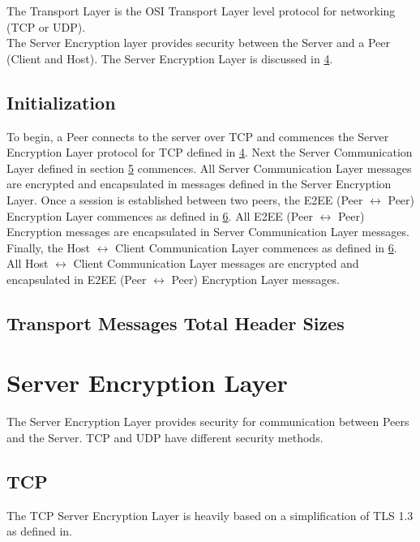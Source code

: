 \documentclass{article}
\begin{document}
    The Transport Layer is the OSI Transport Layer level protocol for networking (TCP or UDP). \\

    The Server Encryption layer provides security between the Server and a Peer (Client and Host). The Server
    Encryption Layer is discussed in \hyperlink{section.4}{4}.

    \subsection{Initialization}

    To begin, a Peer connects to the server over TCP and commences the Server Encryption Layer protocol for TCP
    defined in \hyperlink{section.4}{4}. Next the Server Communication Layer defined in section \hyperlink{section
    .5}{5} commences. All Server Communication Layer messages are encrypted and encapsulated in messages defined in
    the Server Encryption Layer. Once a session is established between two peers, the E2EE (Peer $\leftrightarrow$ Peer)
    Encryption Layer commences as defined in \hyperlink{section.6}{6}. All E2EE (Peer $\leftrightarrow$ Peer)
    Encryption messages are encapsulated in Server Communication Layer messages. Finally, the Host $\leftrightarrow$
    Client Communication Layer commences as defined in \hyperlink{section.6}{6}. All Host $\leftrightarrow$ Client
    Communication Layer messages are encrypted and encapsulated in E2EE (Peer $\leftrightarrow$ Peer) Encryption
    Layer messages.

    \subsection{Transport Messages Total Header Sizes}


    \section{Server Encryption Layer}

    The Server Encryption Layer provides security for communication between Peers and the Server. TCP and UDP have
    different security methods.

    \subsection{TCP}

    The TCP Server Encryption Layer is heavily based on a simplification of TLS 1.3 as defined in. %
\end{document}

